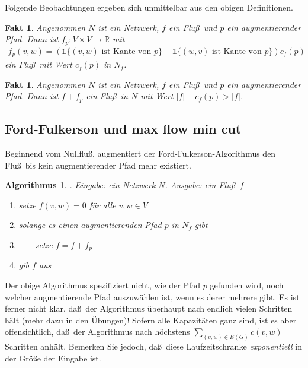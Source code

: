 \documentclass[10pt,reqno]{amsart}
\numberwithin{equation}{section}
\newcommand\RR{\mathbb R}
\newtheorem{algorithm}[definition]{Algorithmus}
\newtheorem{fact}[definition]{Fakt}
\newcommand{\vecone}{\mathbb{1}}
\newcommand\bc[1]{\left({#1}\right)}
\begin{document}
Folgende Beobachtungen ergeben sich unmittelbar aus den obigen Definitionen.

\begin{fact}\label{lem_aug}
	Angenommen $N$ ist ein Netzwerk, $f$ ein Flu\ss\ und $p$ ein augmentierender Pfad.
	Dann ist $f_p:V\times V\to\RR$ mit
	\begin{align*}
		f_p(v,w)=\bc{\vecone\{(v,w)\mbox{ ist Kante von }p\}-\vecone\{(w,v)\mbox{ ist Kante von }p\}}c_f(p)
	\end{align*}
	ein Flu\ss\ mit Wert $c_f(p)$ in $N_f$.
\end{fact}

\begin{fact}\label{cor_aug}
	Angenommen $N$ ist ein Netzwerk, $f$ ein Flu\ss\ und $p$ ein augmentierender Pfad.
	Dann ist $f+f_p$ ein Flu\ss\ in $N$ mit Wert $|f|+c_f(p)>|f|$.
\end{fact}

\subsection{Ford-Fulkerson und max flow min cut}\label{sec_ff}
Beginnend vom Nullflu\ss, augmentiert der Ford-Fulkerson-Algorithmus den Flu\ss\ bis kein augmentierender Pfad mehr existiert.

\begin{algorithm}. {\em Eingabe:} ein Netzwerk $N$. \label{alg_ff}
	{\em Ausgabe:} ein Flu\ss\ $f$
	\begin{enumerate}
		\item setze $f(v,w)=0$ f\"ur alle $v,w\in V$
		\item solange es einen augmentierenden Pfad $p$ in $N_f$ gibt
		\item $\qquad$setze $f=f+f_p$
		\item gib $f$ aus
	\end{enumerate}
\end{algorithm}

Der obige Algorithmus spezifiziert nicht, wie der Pfad $p$ gefunden wird, noch welcher augmentierende Pfad auszuw\"ahlen ist, wenn es derer mehrere gibt.
Es ist ferner nicht klar, da\ss\ der Algorithmus \"uberhaupt nach endlich vielen Schritten h\"alt (mehr dazu in den \"Ubungen)!
Sofern alle Kapazit\"aten ganz sind, ist es aber offensichtlich, da\ss\ der Algorithmus nach h\"ochstens $\sum_{(v,w)\in E(G)}c(v,w)$ Schritten anh\"alt.
Bemerken Sie jedoch, da\ss\ diese Laufzeitschranke \emph{exponentiell} in der Gr\"o\ss e der Eingabe ist.
\end{document}
